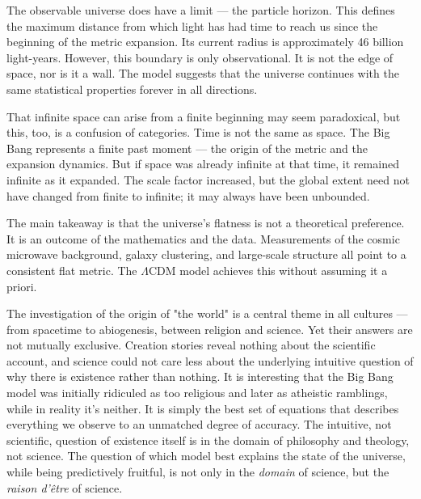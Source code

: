 The observable universe does have a limit — the particle horizon. This defines the maximum distance from which light has had time to reach us since the beginning of the metric expansion. Its current radius is approximately 46 billion light-years. However, this boundary is only observational. It is not the edge of space, nor is it a wall. The model suggests that the universe continues with the same statistical properties forever in all directions.

That infinite space can arise from a finite beginning may seem paradoxical, but this, too, is a confusion of categories. Time is not the same as space. The Big Bang represents a finite past moment — the origin of the metric and the expansion dynamics. But if space was already infinite at that time, it remained infinite as it expanded. The scale factor increased, but the global extent need not have changed from finite to infinite; it may always have been unbounded.

The main takeaway is that the universe's flatness is not a theoretical preference. It is an outcome of the mathematics and the data. Measurements of the cosmic microwave background, galaxy clustering, and large-scale structure all point to a consistent flat metric. The $\Lambda$CDM model achieves this without assuming it a priori. 


\begin{commentary}[ex nihilo]
The investigation of the origin of "the world" is a central theme in all cultures — from spacetime to abiogenesis, between religion and science. Yet their answers are not mutually exclusive. Creation stories reveal nothing about the scientific account, and science could not care less about the underlying intuitive question of why there is existence rather than nothing. It is interesting that the Big Bang model was initially ridiculed as too religious and later as atheistic ramblings, while in reality it's neither. It is simply the best set of equations that describes everything we observe to an unmatched degree of accuracy. The intuitive, not scientific, question of existence itself is in the domain of philosophy and theology, not science. The question of which model best explains the state of the universe, while being predictively fruitful, is not only in the \textit{domain} of science, but the \textit{raison d'être} of science.
\end{commentary}

\newpage
\thispagestyle{empty}

